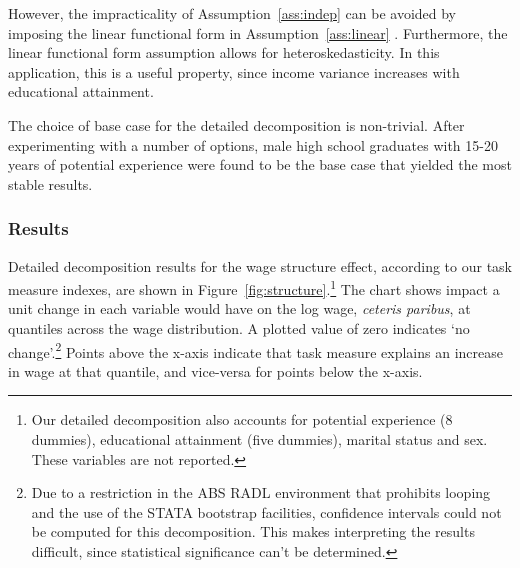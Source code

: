 However, the impracticality of Assumption~\ref{ass:indep} can be avoided by imposing the linear functional form in Assumption~\ref{ass:linear} \citep[p.28]{Fortin2011}. Furthermore, the linear functional form assumption allows for heteroskedasticity. In this application, this is a useful property, since income variance increases with educational attainment.

The choice of base case for the detailed decomposition is non-trivial. After experimenting with a number of options, male high school graduates with 15-20 years of potential experience were found to be the base case that yielded the most stable results.

\subsubsection{Results}

Detailed decomposition results for the wage structure effect, according to our task measure indexes, are shown in Figure~\ref{fig:structure}.\footnote{Our detailed decomposition also accounts for potential experience (8 dummies), educational attainment (five dummies), marital status and sex. These variables are not reported.} The chart shows impact a unit change in each variable would have on the log wage, {\em ceteris paribus}, at quantiles across the wage distribution. A plotted value of zero indicates `no change'.\footnote{Due to a restriction in the ABS RADL environment that prohibits looping and the use of the STATA bootstrap facilities, confidence intervals could not be computed for this decomposition. This makes interpreting the results difficult, since statistical significance can't be determined.} Points above the x-axis indicate that task measure explains an increase in wage at that quantile, and vice-versa for points below the x-axis.

